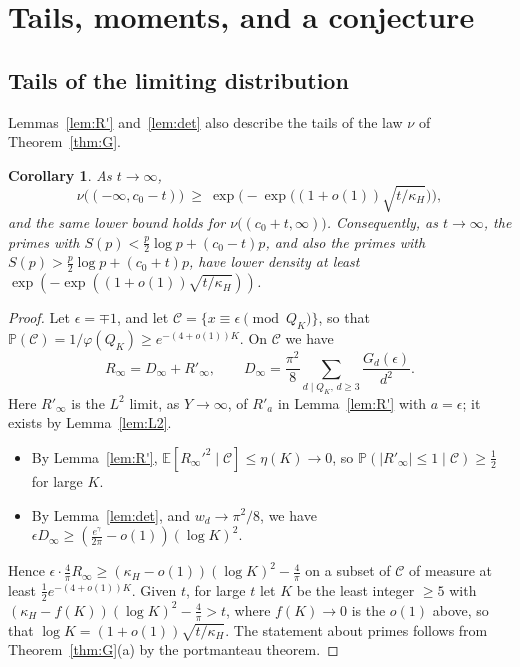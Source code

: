 \documentclass[11pt]{amsart}
\newtheorem{corollary}[lemma]{Corollary}
\theoremstyle{remark}
\newcommand{\E}{\mathbb{E}}
\newcommand{\Prob}{\mathbb{P}}
\begin{document}
\section{Tails, moments, and a conjecture}\label{sec:I}

\subsection{Tails of the limiting distribution}

Lemmas~\ref{lem:R'} and~\ref{lem:det} also describe the tails of the law $\nu$ of Theorem~\ref{thm:G}.

\begin{corollary}\label{cor:tails}
As $t\to\infty$,
\[
\nu\big((-\infty,c_0-t)\big)\ \ge\ \exp\Big(-\exp\big((1+o(1))\sqrt{t/\kappa_H}\big)\Big),
\]
and the same lower bound holds for $\nu\big((c_0+t,\infty)\big)$. Consequently, as $t\to\infty$, the primes with $S(p)<\frac p2\log p+(c_0-t)p$, and also the primes with $S(p)>\frac p2\log p+(c_0+t)p$, have lower density at least $\exp(-\exp((1+o(1))\sqrt{t/\kappa_H}))$.
\end{corollary}

\begin{proof}
Let $\epsilon=\mp1$, and let $\mathcal C=\{x\equiv\epsilon\pmod{Q_K}\}$, so that $\Prob(\mathcal C)=1/\varphi(Q_K)\ge e^{-(4+o(1))K}$. On $\mathcal C$ we have
\[
R_\infty=D_\infty+R'_\infty,\qquad D_\infty=\frac{\pi^2}8\sum_{d\mid Q_K,\,d\ge3}\frac{G_d(\epsilon)}{d^2}.
\]
Here $R'_\infty$ is the $L^2$ limit, as $Y\to\infty$, of $R'_a$ in Lemma~\ref{lem:R'} with $a=\epsilon$; it exists by Lemma~\ref{lem:L2}.
\begin{itemize}
\item By Lemma~\ref{lem:R'}, $\E[R_\infty'^2\mid\mathcal C]\le\eta(K)\to0$, so $\Prob(|R'_\infty|\le1\mid\mathcal C)\ge\frac12$ for large $K$.
\item By Lemma~\ref{lem:det}, and $w_d\to\pi^2/8$, we have $\epsilon D_\infty\ge(\frac{e^\gamma}{2\pi}-o(1))(\log K)^2$.
\end{itemize}
Hence $\epsilon\cdot\frac4\pi R_\infty\ge(\kappa_H-o(1))(\log K)^2-\frac4\pi$ on a subset of $\mathcal C$ of measure at least $\frac12e^{-(4+o(1))K}$. Given $t$, for large $t$ let $K$ be the least integer $\ge5$ with $(\kappa_H-f(K))(\log K)^2-\frac4\pi>t$, where $f(K)\to0$ is the $o(1)$ above, so that $\log K=(1+o(1))\sqrt{t/\kappa_H}$. The statement about primes follows from Theorem~\ref{thm:G}(a) by the portmanteau theorem.
\end{proof}
\end{document}
